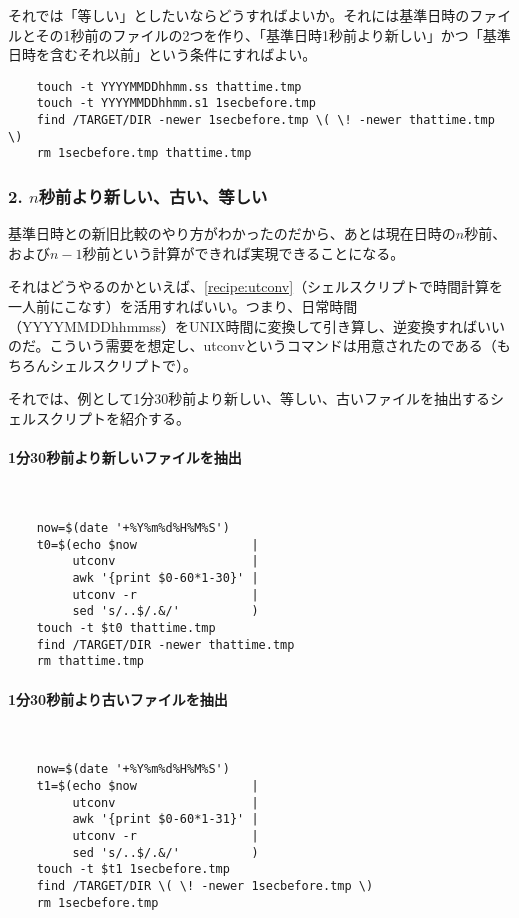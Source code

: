 それでは「等しい」としたいならどうすればよいか。それには基準日時のファイルとその1秒前のファイルの2つを作り、「基準日時1秒前より新しい」かつ「基準日時を含むそれ以前」という条件にすればよい。\\
\begin{frameboxit}{160.0mm}
\begin{verbatim}
	touch -t YYYYMMDDhhmm.ss thattime.tmp
	touch -t YYYYMMDDhhmm.s1 1secbefore.tmp
	find /TARGET/DIR -newer 1secbefore.tmp \( \! -newer thattime.tmp \)
	rm 1secbefore.tmp thattime.tmp
\end{verbatim}
\end{frameboxit}

\subsubsection*{2. $n$秒前より新しい、古い、等しい}

基準日時との新旧比較のやり方がわかったのだから、あとは現在日時の$n$秒前、および$n-1$秒前という計算ができれば実現できることになる。

それはどうやるのかといえば、\ref{recipe:utconv}（シェルスクリプトで時間計算を一人前にこなす）を活用すればいい。つまり、日常時間（YYYYMMDDhhmmss）をUNIX時間に変換して引き算し、逆変換すればいいのだ。こういう需要を想定し、utconvというコマンドは用意されたのである（もちろんシェルスクリプトで）。

それでは、例として1分30秒前より新しい、等しい、古いファイルを抽出するシェルスクリプトを紹介する。

\paragraph{1分30秒前より新しいファイルを抽出}　\\
\begin{frameboxit}{160.0mm}
\begin{verbatim}
	now=$(date '+%Y%m%d%H%M%S')
	t0=$(echo $now                |
	     utconv                   |
	     awk '{print $0-60*1-30}' |
	     utconv -r                |
	     sed 's/..$/.&/'          )
	touch -t $t0 thattime.tmp
	find /TARGET/DIR -newer thattime.tmp
	rm thattime.tmp
\end{verbatim}
\end{frameboxit}

\paragraph{1分30秒前より古いファイルを抽出}　\\
\begin{frameboxit}{160.0mm}
\begin{verbatim}
	now=$(date '+%Y%m%d%H%M%S')
	t1=$(echo $now                |
	     utconv                   |
	     awk '{print $0-60*1-31}' |
	     utconv -r                |
	     sed 's/..$/.&/'          )
	touch -t $t1 1secbefore.tmp
	find /TARGET/DIR \( \! -newer 1secbefore.tmp \)
	rm 1secbefore.tmp
\end{verbatim}
\end{frameboxit}

